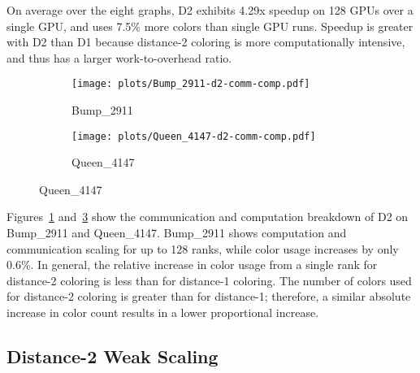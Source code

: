 On average over the eight graphs, D2 exhibits 4.29x speedup on 128 GPUs over a single GPU, and uses 7.5\% more colors than single GPU runs.
Speedup is greater with D2 than D1 because distance-2 coloring is more computationally intensive, and thus has a larger work-to-overhead ratio.

\begin{figure}[h]
  \centering
  \caption{D2 communication time (comm) and computation time (comp) from 1 to 128 GPUs.}
  \label{IAB:distance2breakdown}
  \begin{subfigure}[b]{0.25\textwidth}
    \centering
    \texttt{[image: plots/Bump\_2911-d2-comm-comp.pdf]}
    \caption{Bump\_2911}
    \label{IAB:bumpbreakdown}
  \end{subfigure}%
  \begin{subfigure}[b]{0.22\textwidth}
    \centering
    \texttt{[image: plots/Queen\_4147-d2-comm-comp.pdf]}
    \caption{Queen\_4147}
    \label{IAB:d2queenbreakdown}
  \end{subfigure}
\end{figure}

Figures~\ref{IAB:bumpbreakdown} and~\ref{IAB:d2queenbreakdown} show the communication and computation breakdown of D2 on Bump\_2911 and Queen\_4147.
Bump\_2911 shows computation and communication scaling for up to 128 ranks, while color usage increases by only 0.6\%.
In general, the relative increase in color usage from a single rank for distance-2 coloring is less than for distance-1 coloring. The number of colors used for distance-2 coloring is greater than for distance-1; therefore, a similar absolute increase in color count results in a lower proportional increase. 

\subsection{Distance-2 Weak Scaling}

